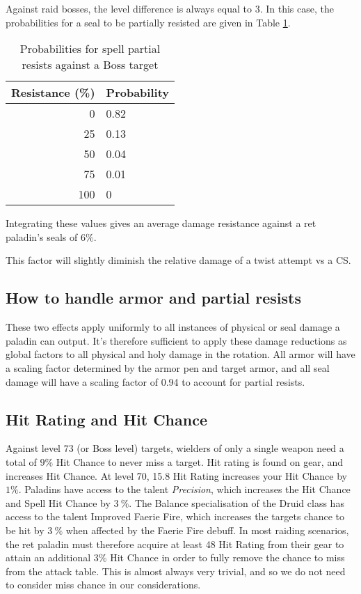 \documentclass[letterpaper,11pt]{article}
\begin{document}
	Against raid bosses, the level difference is always equal to 3.
	In this case, the probabilities for a seal to be partially resisted are given in Table \ref{tab:glancing}.
	\begin{table}[htb]
		\centering
			\begin{tabular}{r | l}
				Resistance (\%) & Probability \\
				\hline \hline
				0 & 0.82 \\
				25 & 0.13 \\
				50 & 0.04 \\
				75 & 0.01 \\
				100 & 0 \\
				\hline
			\end{tabular}
	    	\caption{Probabilities for spell partial resists against a Boss target}		
			\label{tab:glancing}
	\end{table}
	Integrating these values gives an average damage resistance against a ret paladin's seals of $6\%$.
	
	This factor will slightly diminish the relative damage of a twist attempt vs a CS.
	
	\subsection{How to handle armor and partial resists}
	These two effects apply uniformly to all instances of physical or seal damage a paladin can output.
	It's therefore sufficient to apply these damage reductions as global factors to all physical and holy damage in the rotation.
	All armor will have a scaling factor determined by the armor pen and target armor, and all seal damage will have a scaling factor of 0.94 to account for partial resists.

	\subsection{Hit Rating and Hit Chance}
	Against level 73 (or Boss level) targets, wielders of only a single weapon need a total of $9\%$ Hit Chance to never miss a target.
	Hit rating is found on gear, and increases Hit Chance.
	At level 70, 15.8 Hit Rating increases your Hit Chance by $1\%$. 
	Paladins have access to the talent \emph{Precision}, which increases the Hit Chance and Spell Hit Chance by $3~\%$.
	The Balance specialisation of the Druid class has access to the talent Improved Faerie Fire, which increases the targets chance to be hit by $3~\%$ when affected by the Faerie Fire debuff.
	In most raiding scenarios, the ret paladin must therefore acquire at least 48 Hit Rating from their gear to attain an additional $3\%$ Hit Chance in order to fully remove the chance to miss from the attack table.
	This is almost always very trivial, and so we do not need to consider miss chance in our considerations.
		
\end{document}
